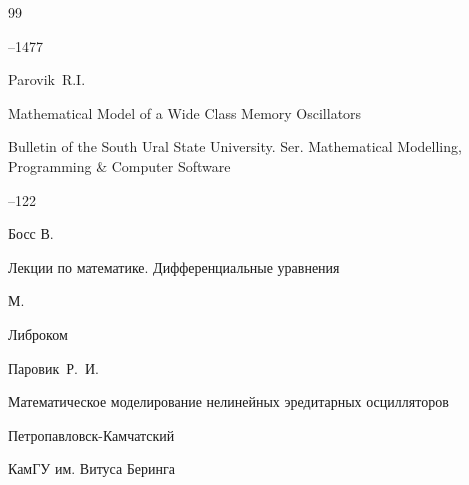 \begin{thebibliography}{99}


--1477





\by Parovik~R.I. 

\paper Mathematical Model of a Wide Class Memory Oscillators

\jour Bulletin of the South Ural State University. Ser. Mathematical Modelling, Programming \& Computer Software 




--122





\by Босс В. 

\book Лекции по математике. Дифференциальные уравнения


\publaddr М.

\publ Либроком














\by Паровик~Р.~И. 

\book Математическое моделирование нелинейных эредитарных осцилляторов

\publaddr Петропавловск-Камчатский

\publ КамГУ им. Витуса Беринга






\end{thebibliography}
